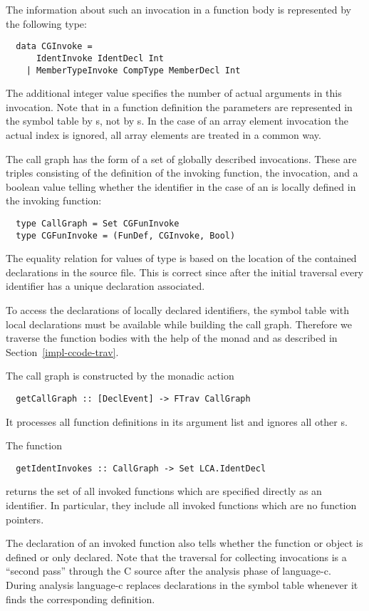 The information about such an invocation in a function body is represented by the following type:
\begin{verbatim}
  data CGInvoke =
      IdentInvoke IdentDecl Int
    | MemberTypeInvoke CompType MemberDecl Int
\end{verbatim}
The additional integer value specifies the number of actual arguments in this invocation.
Note that in a function definition
the parameters are represented in the symbol table by s, not by s. In the case
of an array element invocation the actual index is ignored, all array elements are treated in a common way.

The call graph has the form of a set of globally described invocations. These are triples consisting of the definition
of the invoking function, the invocation, and a boolean value telling whether the identifier in the case of an
 is locally defined in the invoking function:
\begin{verbatim}
  type CallGraph = Set CGFunInvoke
  type CGFunInvoke = (FunDef, CGInvoke, Bool)
\end{verbatim}
The equality relation for values of type  is based on the location of the contained declarations
in the source file. This is correct since after the initial traversal every identifier has a unique declaration associated.

To access the declarations of locally declared identifiers, the symbol table with local declarations
must be available while building the call graph. Therefore we traverse the function bodies with the help of
the  monad and  as described in Section~\ref{impl-ccode-trav}.

The call graph is constructed by the monadic action
\begin{verbatim}
  getCallGraph :: [DeclEvent] -> FTrav CallGraph
\end{verbatim}
It processes all function definitions in its argument list and ignores all other s.

The function 
\begin{verbatim}
  getIdentInvokes :: CallGraph -> Set LCA.IdentDecl
\end{verbatim}
returns the set of all invoked functions which are specified directly as an identifier. In particular, they include
all invoked functions which are no function pointers.

The declaration of an invoked function also tells 
whether the function or object is defined or only declared. Note that the traversal for collecting invocations is a ``second 
pass'' through the C source after the analysis phase of language-c. During analysis language-c replaces
declarations in the symbol table whenever it finds the corresponding definition.

